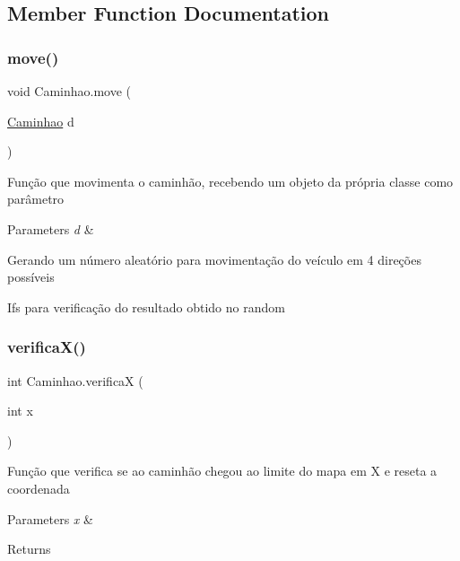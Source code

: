 \subsection{Member Function Documentation}
\mbox{\label{classCaminhao_ad5c349085ca9b79dd22f9d230205dd9d}} 
\subsubsection{\texorpdfstring{move()}{move()}}
{\footnotesize\ttfamily void Caminhao.\+move (\begin{DoxyParamCaption}\item[{\hyperlink{classCaminhao}{Caminhao}}]{d }\end{DoxyParamCaption})\hspace{0.3cm}{\ttfamily [inline]}}

Função que movimenta o caminhão, recebendo um objeto da própria classe como parâmetro 
\begin{DoxyParams}{Parameters}
{\em d} & \\
\hline
\end{DoxyParams}
Gerando um número aleatório para movimentação do veículo em 4 direções possíveis

Ifs para verificação do resultado obtido no random\mbox{\label{classCaminhao_a42fe92db1834d785615a48b6a996ab51}} 
\subsubsection{\texorpdfstring{verifica\+X()}{verificaX()}}
{\footnotesize\ttfamily int Caminhao.\+verificaX (\begin{DoxyParamCaption}\item[{int}]{x }\end{DoxyParamCaption})\hspace{0.3cm}{\ttfamily [inline]}}

Função que verifica se ao caminhão chegou ao limite do mapa em X e reseta a coordenada 
\begin{DoxyParams}{Parameters}
{\em x} & \\
\hline
\end{DoxyParams}
\begin{DoxyReturn}{Returns}

\end{DoxyReturn}
\mbox{\label{classCaminhao_a71435d7d443cf69b29ae66d35e346904}} 
